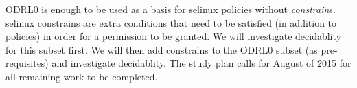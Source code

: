 ODRL0 is enough to be used as a basis for \ac{selinux} policies without \emph{constrain}s. \ac{selinux} constrains are extra  conditions that need to be satisfied (in addition to policies) in order for a permission to be granted. We will investigate decidablity for this subset first. We will then add constrains to the ODRL0 subset (as pre-requisites) and investigate decidablity. The study plan calls for August of 2015 for all remaining work to be completed.













